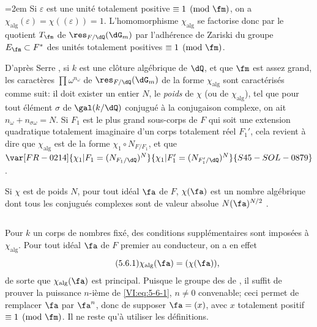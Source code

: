 \subsection{}\label{VI:5-5}

\begingroup
\emergencystretch=2em\relax
Si $\varepsilon$ est une unité totalement positive $\equiv 1\pmod\fm$, on a 
$\chi_\text{alg}(\varepsilon) = \chi((\varepsilon)) = 1$. L'homomorphisme 
$\chi_\text{alg}$ se factorise donc par le quotient $T_\fm$ de 
$\res_{F/\dQ}(\dG_m)$ par l'adhérence de Zariski du groupe 
$E_\fm\subset F^\ast$ des unités totalement positives $\equiv 1\pmod\fm$.\par
\endgroup 

D'après Serre , si $k$ est une clôture algébrique de 
$\dQ$, et que $\fm$ est assez grand, les caractères $\prod \omega^{n_\omega}$ 
de $\res_{F/\dQ}(\dG_m)$ de la forme $\chi_\text{alg}$ sont caractérisés 
comme suit: il doit exister un entier $N$, le \emph{poids} de $\chi$ (ou de 
$\chi_\text{alg}$), tel que pour tout élément $\sigma$ de $\gal(k/\dQ)$ 
conjugué à la conjugaison complexe, on ait $n_\omega+n_{\sigma \omega}=N$. Si 
$F_1$ est le plus grand sous-corps de $F$ qui soit une extension quadratique 
totalement imaginaire d'un corps totalement réel $F_1'$, cela revient à 
dire que $\chi_\text{alg}$ est de la forme $\chi_1\circ N_{F/F_1}$, et que 
$\var[FR-0214]{\chi_1|F_1=(N_{F_1/\dQ})^N}{\chi_1|F_1'=(N_{F_1'/\dQ})^N}{S45-SOL-0879}$. 

Si $\chi$ est de poids $N$, pour tout idéal $\fa$ de $F$, $\chi(\fa)$ est un 
nombre algébrique dont tous les conjugués complexes sont de valeur absolue 
$N(\fa)^{N/2}$ . 





\subsection{}\label{VI:5-6}

Pour $k$ un corps de nombres fixé, des conditions supplémentaires sont 
imposées à $\chi_\text{alg}$. Pour tout idéal $\fa$ de $F$ premier au 
conducteur, on a en effet 
\begin{equation*}\tag{5.6.1}\label{VI:eq:5-6-1}
  \chi_\text{alg}(\fa) = (\chi(\fa)) \text{,} 
\end{equation*}
de sorte que $\chi_\text{alg}(\fa)$ est principal. Puisque le groupe des 
 de , il suffit de prouver la 
puissance $n$-ième de \eqref{VI:eq:5-6-1}, $n\ne 0$ convenable; ceci permet 
de remplacer $\fa$ par $\fa^n$, donc de supposer $\fa=(x)$, avec $x$ totalement 
positif $\equiv 1\pmod\fm$. Il ne reste qu'à utiliser les définitions. 

